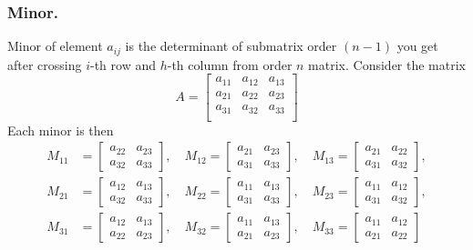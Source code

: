 \documentclass[../main.tex]{subfiles}
\begin{document}
\subsubsection*{Minor.}
Minor of element $a_{ij}$ is the determinant of submatrix order $(n-1)$ you get after crossing $i$-th row and $h$-th column from order $n$ matrix.
Consider the matrix
\begin{equation*}
	A=\begin{bmatrix}
		a_{11} & a_{12} & a_{13} \\
		a_{21} & a_{22} & a_{23} \\
		a_{31} & a_{32} & a_{33} \\
	\end{bmatrix}
\end{equation*}
Each minor is then
\begin{align*}
	M_{11} & = \begin{bmatrix} a_{22} & a_{23} \\ a_{32} & a_{33} \end{bmatrix}, \quad
	M_{12} = \begin{bmatrix} a_{21} & a_{23} \\ a_{31} & a_{33} \end{bmatrix}, \quad
	M_{13} = \begin{bmatrix} a_{21} & a_{22} \\ a_{31} & a_{32} \end{bmatrix},         \\
	M_{21} & = \begin{bmatrix} a_{12} & a_{13} \\ a_{32} & a_{33} \end{bmatrix}, \quad
	M_{22} = \begin{bmatrix} a_{11} & a_{13} \\ a_{31} & a_{33} \end{bmatrix}, \quad
	M_{23} = \begin{bmatrix} a_{11} & a_{12} \\ a_{31} & a_{32} \end{bmatrix},         \\
	M_{31} & = \begin{bmatrix} a_{12} & a_{13} \\ a_{22} & a_{23} \end{bmatrix}, \quad
	M_{32} = \begin{bmatrix} a_{11} & a_{13} \\ a_{21} & a_{23} \end{bmatrix}, \quad
	M_{33} = \begin{bmatrix} a_{11} & a_{12} \\ a_{21} & a_{22} \end{bmatrix}
\end{align*}
\end{document}
